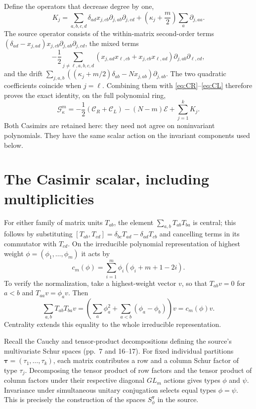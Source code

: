 \documentclass[11pt]{article}
\newcommand{\G}{\mathcal G}
\newcommand{\E}{\mathcal E}
\newcommand{\C}{\mathcal C}
\begin{document}
Define the operators that decrease degree by one,
\begin{equation}\label{eq:K}
 K_j=\sum_{a,b,c,d}\delta_{ad}x_{j,cb}
          \partial_{j,ab}\partial_{j,cd}
       +\left(\kappa_j+\frac m2\right)\sum_a\partial_{j,aa}.
\end{equation}
The source operator consists of the within-matrix second-order terms
$(\delta_{ad}-x_{j,ad})x_{j,cb}\partial_{j,ab}\partial_{j,cd}$,
the mixed terms
\[
 -\frac12\sum_{j\ne\ell,a,b,c,d}
 (x_{j,ad}x_{\ell,cb}+x_{j,cb}x_{\ell,ad})
 \partial_{j,ab}\partial_{\ell,cd},
\]
and the drift
$\sum_{j,a,b}((\kappa_j+m/2)\delta_{ab}-Nx_{j,ab})\partial_{j,ab}$.
The two quadratic coefficients coincide when $j=\ell$.
Combining them with \eqref{eq:CR}--\eqref{eq:CL} therefore proves the
exact identity, on the full polynomial ring,
\begin{equation}\label{eq:operator}
 \boxed{\quad
 \G^m_\kappa=-\frac12(\C_R+\C_L)-(N-m)\E+\sum_{j=1}^k K_j.
 \quad}
\end{equation}
Both Casimirs are retained here: they need not agree on noninvariant
polynomials. They have the same scalar action on the invariant
components used below.

\section*{The Casimir scalar, including multiplicities}
For either family of matrix units $T_{ab}$, the element
$\sum_{a,b}T_{ab}T_{ba}$ is central; this follows by substituting
$[T_{ab},T_{cd}]=\delta_{bc}T_{ad}-\delta_{ad}T_{cb}$ and cancelling
terms in its commutator with $T_{cd}$.
On the irreducible polynomial representation of highest weight
$\phi=(\phi_1,\ldots,\phi_m)$ it acts by
\begin{equation}\label{eq:casvalue}
 c_m(\phi)=\sum_{i=1}^m\phi_i(\phi_i+m+1-2i).
\end{equation}
To verify the normalization, take a highest-weight vector $v$, so that
$T_{ab}v=0$ for $a<b$ and $T_{aa}v=\phi_av$. Then
\[
 \sum_{a,b}T_{ab}T_{ba}v
 =\left(\sum_a\phi_a^2+\sum_{a<b}(\phi_a-\phi_b)\right)v
 =c_m(\phi)v.
\]
Centrality extends this equality to the whole irreducible representation.

Recall the Cauchy and tensor-product decompositions defining the source's
multivariate Schur spaces (pp.~7 and 16--17). For fixed individual
partitions $\boldsymbol\tau=(\tau_1,\ldots,\tau_k)$, each matrix contributes
a row and a column Schur factor of type $\tau_j$. Decomposing the
tensor product of row factors and the tensor product of column factors
under their respective diagonal $GL_m$ actions gives types $\phi$ and
$\psi$. Invariance under simultaneous unitary conjugation selects equal
types $\phi=\psi$. This is precisely the construction of the spaces
$S^{\boldsymbol\tau}_\phi$ in the source.
\end{document}
